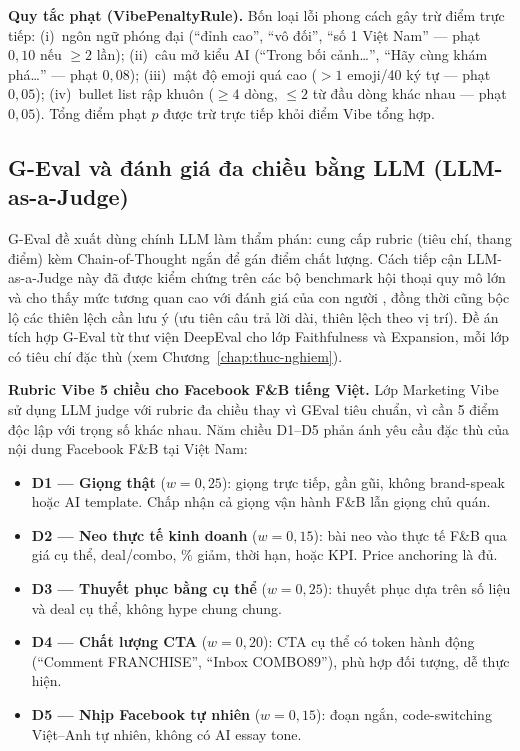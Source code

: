 \textbf{Quy tắc phạt (VibePenaltyRule).}
Bốn loại lỗi phong cách gây trừ điểm trực tiếp:
(i)~ngôn ngữ phóng đại (``đỉnh cao'', ``vô đối'',
``số 1 Việt Nam'' --- phạt $0{,}10$ nếu $\geq 2$
lần); (ii)~câu mở kiểu AI (``Trong bối cảnh\ldots'',
``Hãy cùng khám phá\ldots'' --- phạt $0{,}08$);
(iii)~mật độ emoji quá cao ($>1$ emoji/40 ký tự ---
phạt $0{,}05$); (iv)~bullet list rập khuôn ($\geq 4$
dòng, $\leq 2$ từ đầu dòng khác nhau --- phạt
$0{,}05$). Tổng điểm phạt $p$ được trừ trực tiếp
khỏi điểm Vibe tổng hợp.

\subsection{G-Eval và đánh giá đa chiều bằng LLM (LLM-as-a-Judge)}

G-Eval  đề xuất dùng chính LLM làm thẩm phán: cung cấp
rubric (tiêu chí, thang điểm) kèm Chain-of-Thought
 ngắn
để gán điểm chất lượng. Cách tiếp cận LLM-as-a-Judge
này đã được kiểm chứng trên các bộ benchmark hội thoại
quy mô lớn và cho thấy mức tương quan cao với đánh giá
của con người , đồng thời cũng
bộc lộ các thiên lệch cần lưu ý (ưu tiên câu trả lời
dài, thiên lệch theo vị trí). Đề án tích hợp G-Eval từ thư
viện DeepEval cho lớp Faithfulness và Expansion, mỗi lớp
có tiêu chí đặc thù (xem Chương~\ref{chap:thuc-nghiem}).

\textbf{Rubric Vibe 5 chiều cho Facebook F\&B tiếng Việt.}
Lớp Marketing Vibe sử dụng LLM judge với rubric đa chiều
thay vì GEval tiêu chuẩn, vì cần 5 điểm độc lập với
trọng số khác nhau. Năm chiều D1--D5 phản ánh yêu cầu
đặc thù của nội dung Facebook F\&B tại Việt Nam:

\begin{itemize}
  \item \textbf{D1 --- Giọng thật} ($w = 0{,}25$): giọng
    trực tiếp, gần gũi, không brand-speak hoặc AI
    template. Chấp nhận cả giọng vận hành F\&B lẫn
    giọng chủ quán.
  \item \textbf{D2 --- Neo thực tế kinh doanh} ($w =
    0{,}15$): bài neo vào thực tế F\&B qua giá cụ thể,
    deal/combo, \% giảm, thời hạn, hoặc KPI. Price
    anchoring là đủ.
  \item \textbf{D3 --- Thuyết phục bằng cụ thể} ($w =
    0{,}25$): thuyết phục dựa trên số liệu và deal cụ
    thể, không hype chung chung.
  \item \textbf{D4 --- Chất lượng CTA} ($w = 0{,}20$):
    CTA cụ thể có token hành động (``Comment FRANCHISE'',
    ``Inbox COMBO89''), phù hợp đối tượng, dễ thực hiện.
  \item \textbf{D5 --- Nhịp Facebook tự nhiên} ($w =
    0{,}15$): đoạn ngắn, code-switching Việt--Anh tự
    nhiên, không có AI essay tone.
\end{itemize}

